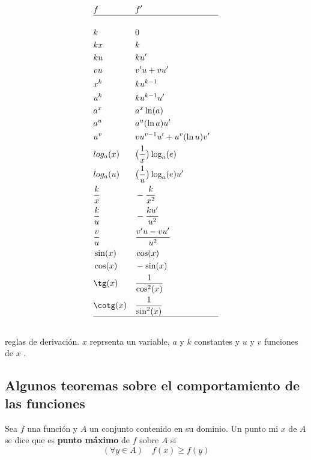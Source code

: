 \documentclass[14pt,a4paper]{extarticle}
\begin{document}
\begin{table}[!htbp]
\begin{align*}
&  f &  &  f'  & \\
 \hline  \\
& k & & 0 & \\
&  kx &  &  k   & \\
&  ku &  &   ku'   & \\
&  vu &  &  v'u + vu'   & \\
&  x^k & &  ku^{k-1}   & \\
&  u^k  & &  ku^{k-1}u'   & \\
&  a^x  & &  a^x\ln(a)   & \\
&  a^u  & &  a^u(\ln a)u'   & \\
&  u^v  & &  vu^{v-1}u'+u^v(\ln u)v'   & \\
&  log_a(x) & &   \big(\frac{1}{x}\big)\log_a(e)  & \\
&  log_a(u) & &   \big(\frac{1}{u}\big)\log_a(e)u'  & \\
&  \frac{k}{x} & &  -\frac{k}{x^2}  & \\
&  \frac{k}{u}  & &  -\frac{ku'}{u^2}   & \\
&  \frac{v}{u}  & &  \frac{v'u-vu'}{u^2}  & \\
& \sin(x) & & \cos(x) & \\
& \cos(x) & & -\sin(x) & \\
& \tg(x) & & \frac{1}{\cos^2(x)}  & \\
& \cotg(x) & & \frac{1}{\sin^2(x)}  & \\
\hline \\
\end{align*}
\caption{reglas de derivaci\'on.  \( x \) reprsenta un variable, \( a \) y \( k \)
constantes y \( u \) y \( v \) funciones de \( x \) .
}
\label{tab:derReg}
\end{table}


\subsection{Algunos teoremas sobre el comportamiento de las funciones}

\begin{mydef}
Sea \( f \) una funci\'on y \( A \) un conjunto contenido en su
dominio. Un punto mi \( x \) de \( A \) se dice que es \textbf{punto
  m\'aximo} de \( f \) sobre \( A \)  si
\begin{equation}
(\forall y \in A) \quad f(x) \geq f(y)
\end{equation}
\end{mydef}
\end{document}
